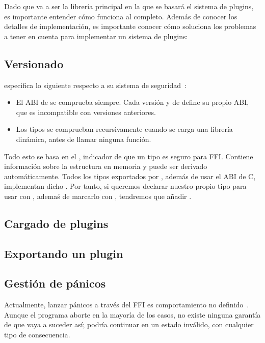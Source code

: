 Dado que \abistable va a ser la librería principal en la que se basará el
sistema de plugins, es importante entender cómo funciona al completo. Además de
conocer los detalles de implementación, es importante conocer cómo \abistable
soluciona los problemas a tener en cuenta para implementar un sistema de
plugins:

\subsection{Versionado}

\abistable especifica lo siguiente respecto a su sistema de
seguridad~\cite{abistable_safety}:

\begin{itemize}
    \item El ABI de \abistable se comprueba siempre. Cada versión  y
         de \abistable define su propio ABI, que es incompatible
        con versiones anteriores.

    \item Los tipos se comprueban recursivamente cuando se carga una librería
        dinámica, antes de llamar ninguna función.

\end{itemize}

Todo esto se basa en el \trait {}, indicador de que un tipo es
seguro para FFI. Contiene información sobre la estructura en memoria y puede ser
derivado automáticamente. Todos los tipos exportados por \abistable, además de
usar el ABI de C, implementan dicho \trait. Por tanto, si queremos declarar
nuestro propio tipo para usar con \abistable, ademaś de marcarlo con
\code{#[repr(C)]}, tendremos que añadir .

\subsection{Cargado de plugins}

\subsection{Exportando un plugin}

\subsection{Gestión de pánicos}

Actualmente, lanzar pánicos a través del FFI es comportamiento no
definido~\cite{panicsnomicon}. Aunque el programa aborte en la mayoría de los
casos, no existe ninguna garantía de que vaya a suceder así; podría continuar en
un estado inválido, con cualquier tipo de consecuencia.

